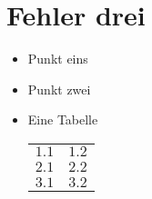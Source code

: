 \section{Fehler drei}

\begin{itemize}
	\item Punkt eins
	\item Punkt zwei
	\item Eine Tabelle\\[1em]
		\begin{tabular}{|l|l|}
		\hline
		$1.1$&$1.2$\\
		$2.1$&$2.2$\\
		$3.1$&$3.2$\\
		\hline
		\end{tabular}
	\end{itemize}


